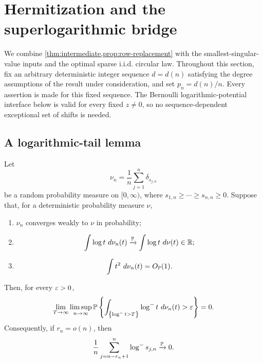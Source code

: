 \section{Hermitization and the superlogarithmic bridge}\label{sec:hermitization}

We combine \cref{thm:intermediate,prop:row-replacement} with the smallest-singular-value inputs and the optimal sparse i.i.d. circular law. Throughout this section, fix an arbitrary deterministic integer sequence $d=d(n)$ satisfying the degree assumptions of the result under consideration, and set $p_n=d(n)/n$. Every assertion is made for this fixed sequence. The Bernoulli logarithmic-potential interface below is valid for every fixed $z\ne0$, so no sequence-dependent exceptional set of shifts is needed.

\subsection{A logarithmic-tail lemma}

\begin{lemma}\label{lem:negative-log-tail}
Let
\[
  \nu_n=\frac1n\sum_{j=1}^n\delta_{s_{j,n}}
\]
be a random probability measure on $[0,\infty)$, where $s_{1,n}\ge\cdots\ge s_{n,n}\ge0$. Suppose that, for a deterministic probability measure $\nu$,
\begin{enumerate}[label=\textup{(\roman*)}]
\item $\nu_n$ converges weakly to $\nu$ in probability;
\item
\[
  \int\log t\,\,d\nu_n(t)
  \xrightarrow{\mathbb P}
  \int\log t\,\,d\nu(t)\in\mathbb R;
\]
\item
\[
  \int t^2\,\,d\nu_n(t)=O_{\mathbb P}(1).
\]
\end{enumerate}
Then, for every $\varepsilon>0$,
\begin{equation}\label{eq:negative-log-UI}
  \lim_{T\to\infty}\limsup_{n\to\infty}
  \mathbb P\left\{
    \int_{\left\{\log^{-} t>T\right\}}\log^{-} t\,\,d\nu_n(t)>\varepsilon
  \right\}=0.
\end{equation}
Consequently, if $r_n=o(n)$, then
\begin{equation}\label{eq:bottom-r-log-tail}
  \frac1n\sum_{j=n-r_n+1}^n\log^{-} s_{j,n}
  \xrightarrow{\mathbb P}0.
\end{equation}
\end{lemma}


